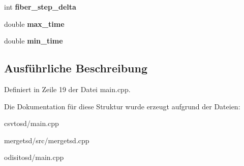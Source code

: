\begin{DoxyCompactItemize}
\item 
\hypertarget{structOptions_a95547c95448d22efb68da033bf4d9f54}{int {\bfseries fiber\-\_\-step\-\_\-delta}}\label{structOptions_a95547c95448d22efb68da033bf4d9f54}

\item 
\hypertarget{structOptions_a9dce89066bd1386957fd2180ae7128ac}{double {\bfseries max\-\_\-time}}\label{structOptions_a9dce89066bd1386957fd2180ae7128ac}

\item 
\hypertarget{structOptions_aa130a70e2d1d1d1fc8d11366de07c8cb}{double {\bfseries min\-\_\-time}}\label{structOptions_aa130a70e2d1d1d1fc8d11366de07c8cb}

\end{DoxyCompactItemize}


\subsection{Ausführliche Beschreibung}


Definiert in Zeile 19 der Datei main.\-cpp.



Die Dokumentation für diese Struktur wurde erzeugt aufgrund der Dateien\-:\begin{DoxyCompactItemize}
\item 
csvtosd/main.\-cpp\item 
mergetsd/src/mergetsd.\-cpp\item 
odisitosd/main.\-cpp\end{DoxyCompactItemize}
